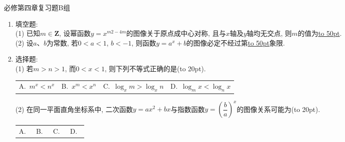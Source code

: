 \documentclass[10pt,a4paper]{article}
\newcommand{\blank}[1]{\underline{\hbox to #1pt{}}}
\newcommand{\bracket}[1]{(\hbox to #1pt{})}
\newcommand{\fourch}[4]{\par\begin{tabular}{p{.23\textwidth}p{.23\textwidth}p{.23\textwidth}p{.23\textwidth}}
A.~#1 &B.~#2& C.~#3& D.~#4
\end{tabular}}
\begin{document}
必修第四章复习题B组
\begin{enumerate}[1.]

\item 填空题:\\
(1) 已知$m\in \mathbf{Z}$, 设幂函数$y=x^{m2-4m}$的图像关于原点成中心对称, 且与$x$轴及$y$轴均无交点, 则$m$的值为\blank{50}.\\
(2) 设$a$、$b$为常数, 若$0<a<1$, $b<-1$, 则函数$y=a^x+b$的图像必定不经过第\blank{50}象限.
\vspace*{3cm}
\item 选择题:\\
(1) 若$m>n>1$, 而$0<x<1$, 则下列不等式正确的是\bracket{20}.
\fourch{$m^x<n^x$}{$x^m<x^n$}{$\log_x m>\log_x n$}{$\log_m x<\log_n x$}
(2) 在同一平面直角坐标系中, 二次函数$y=ax^2+bx$与指数函数$y=(\dfrac ba)^x$的图像关系可能为\bracket{20}.
\fourch{
\begin{tikzpicture}[scale = 0.5, >=latex]
    \draw [->] (-2.5,0) -- (2.5,0) node [below] {$x$};
    \draw [->] (0,-2.) -- (0,2.5) node [left] {$y$};
    \draw (0,0) node [below right] {$O$};
    \draw (-1,0.1) -- (-1,0) node [below] {$-1$};
    \draw (0.1,1) -- (0,1) node [left] {$1$};
    \draw [domain = -1.2:0.7,thick] plot (\x,{3*\x * (\x+0.5)});
    \draw [domain = -1.4:2,thick] plot (\x,{(0.5)^\x}); 
\end{tikzpicture}
}{
\begin{tikzpicture}[scale = 0.5, >=latex]
    \draw [->] (-2.5,0) -- (2.5,0) node [below] {$x$};
    \draw [->] (0,-2.) -- (0,2.5) node [left] {$y$};
    \draw (0,0) node [below left] {$O$};
    \draw (1,0.1) -- (1,0) node [below] {$1$};
    \draw (0.1,1) -- (0,1) node [above right] {$1$};
    \draw [domain = -0.5:1.5,thick] plot (\x,{3*\x*(\x-1)});
    \draw [domain = -1.4:2,thick] plot (\x,{(0.5)^\x}); 
\end{tikzpicture}
}{
\begin{tikzpicture}[scale = 0.5, >=latex]
    \draw [->] (-2.5,0) -- (2.5,0) node [below] {$x$};
    \draw [->] (0,-2.) -- (0,2.5) node [left] {$y$};
    \draw (0,0) node [below left] {$O$};
    \draw (1,0.1) -- (1,0) node [below] {$1$};
    \draw (0.1,1) -- (0,1) node [left] {$1$};
    \draw [domain = -0.5:2.5,thick] plot ({\x},{-\x*(\x-2)});
    \draw [domain = -1.4:2,thick] plot ({-\x},{(0.5)^\x}); 
\end{tikzpicture}
}{
\begin{tikzpicture}[scale = 0.5, >=latex]
    \draw [->] (-2.5,0) -- (2.5,0) node [below] {$x$};
    \draw [->] (0,-2.) -- (0,2.5) node [left] {$y$};
    \draw (0,0) node [below right] {$O$};

\end{tikzpicture}}
\end{enumerate}
\end{document}
